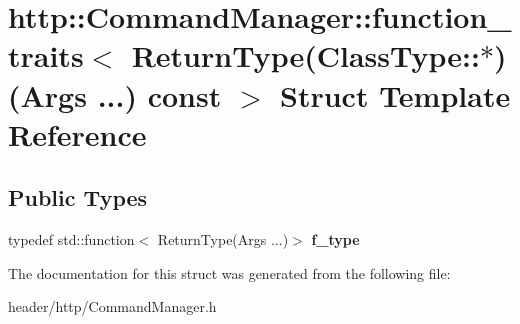 \hypertarget{structhttp_1_1_command_manager_1_1function__traits_3_01_return_type_07_class_type_1_1_5_08_07_args_01_8_8_8_08_01const_01_4}{}\section{http\+:\+:Command\+Manager\+:\+:function\+\_\+traits$<$ Return\+Type(Class\+Type\+:\+:$\ast$)(Args ...) const $>$ Struct Template Reference}
\label{structhttp_1_1_command_manager_1_1function__traits_3_01_return_type_07_class_type_1_1_5_08_07_args_01_8_8_8_08_01const_01_4}
\subsection*{Public Types}
\begin{DoxyCompactItemize}
\item 
\mbox{\label{structhttp_1_1_command_manager_1_1function__traits_3_01_return_type_07_class_type_1_1_5_08_07_args_01_8_8_8_08_01const_01_4_af755381d54336a7a35d381dfa2137796}} 
typedef std\+::function$<$ Return\+Type(Args ...)$>$ {\bfseries f\+\_\+type}
\end{DoxyCompactItemize}


The documentation for this struct was generated from the following file\+:\begin{DoxyCompactItemize}
\item 
header/http/Command\+Manager.\+h\end{DoxyCompactItemize}

